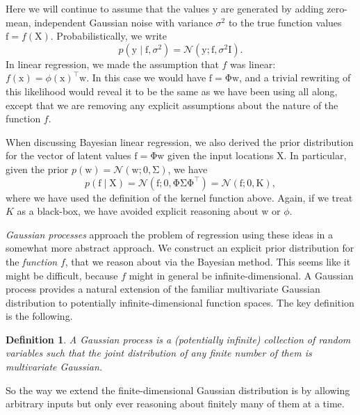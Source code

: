 \documentclass{article}
\newtheorem{defn}{Definition}
\newcommand{\given}{\mid}
\newcommand{\mc}[1]{\mathcal{#1}}
\newcommand{\trans}{^\top}
\newcommand{\mat}[1]{\bm{\mathrm{#1}}}
\renewcommand{\vec}[1]{\bm{\mathrm{#1}}}
\begin{document}
Here we will continue to assume that the values $\vec{y}$ are
generated by adding zero-mean, independent Gaussian noise with
variance $\sigma^2$ to the true function values $\vec{f} =
f(\mat{X})$.  Probabilistically, we write
\begin{equation*}
  p(\vec{y} \given \vec{f}, \sigma^2)
  =
  \mc{N}(\vec{y}; \vec{f}, \sigma^2 \mat{I}).
\end{equation*}
In linear regression, we made the assumption that $f$ was linear:
$f(\vec{x}) = \phi(\vec{x})\trans\vec{w}$.  In this case we would have
$\vec{f} = \mat{\Phi}\vec{w}$, and a trivial rewriting of this
likelihood would reveal it to be the same as we have been using all
along, except that we are removing any explicit assumptions about the
nature of the function $f$.

When discussing Bayesian linear regression, we also derived the prior
distribution for the vector of latent values $\vec{f} =
\mat{\Phi}\vec{w}$ given the input locations $\mat{X}$.  In
particular, given the prior $p(\vec{w}) = \mc{N}(\vec{w}; \vec{0},
\mat{\Sigma})$, we have
\begin{equation*}
  p(\vec{f} \given \mat{X})
  =
  \mc{N}(\vec{f}; \vec{0}, \mat{\Phi}\mat{\Sigma}\mat{\Phi}\trans)
  =
  \mc{N}(\vec{f}; \vec{0}, \mat{K}),
\end{equation*}
where we have used the definition of the kernel function above.
Again, if we treat $K$ as a black-box, we have avoided explicit
reasoning about $\vec{w}$ or $\phi$.

\emph{Gaussian processes} approach the problem of regression using
these ideas in a somewhat more abstract approach.  We construct an
explicit prior distribution for the \emph{function} $f$, that we
reason about via the Bayesian method.  This seems like it might be
difficult, because $f$ might in general be infinite-dimensional.  A
Gaussian process provides a natural extension of the familiar
multivariate Gaussian distribution to potentially infinite-dimensional
function spaces.  The key definition is the following.
\begin{defn}
  A \emph{Gaussian process} is a (potentially infinite) collection of
  random variables such that the joint distribution of any finite
  number of them is multivariate Gaussian.
\end{defn}
So the way we extend the finite-dimensional Gaussian distribution is
by allowing arbitrary inputs but only ever reasoning about finitely
many of them at a time.
\end{document}
